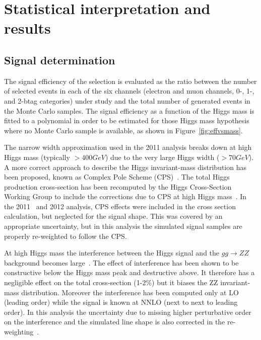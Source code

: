 

\chapter{Statistical interpretation and results}
\label{sec:results}

\section{Signal determination}
The signal efficiency of the selection is evaluated as the ratio between the number of selected events in each of the six channels (electron and muon channels, 0-, 1-, and 2-btag categories) under study and the total number of generated events in the Monte Carlo samples.  The signal efficiency as a function of the Higgs mass is fitted to a polynomial in order to be estimated for those Higgs mass hypothesis where no Monte Carlo sample is available, 
as shown in Figure~\ref{fig:effvsmass}.

The narrow width approximation used in the 2011 analysis breaks down at high Higgs mass (typically $>400 GeV$) due to the very large Higgs width ($>70 GeV$). 
A more correct approach to describe the Higgs invariant-mass distribution has been proposed, known as Complex Pole Scheme (CPS)~\cite{Goria:2011wa}.
The total Higgs production cross-section has been recomputed by the Higgs Cross-Section Working Group to include the corrections due to CPS at high Higgs mass~\cite{LHC-HCS}.  In the 2011~\cite{HIG-11-027} and 2012 analysis, CPS effects were included in the cross section calculation, but neglected for the signal shape.  This was covered by an appropriate uncertainty, but in this analysis the simulated signal samples are properly re-weighted to follow the CPS.

At high Higgs mass the interference between the Higgs signal and the $gg\rightarrow ZZ$ background becomes large~\cite{Passarino:2012ri}.  The effect of interference has been shown to be constructive below the Higgs mass peak and destructive above. It therefore has a negligible effect on the total cross-section (1-2\%) but it biases the ZZ invariant-mass distribution. Moreover the interference has been computed only at LO (leading order) while the signal is known at NNLO (next to next to leading order). In this analysis the uncertainty due to missing higher perturbative order on the interference and the simulated line shape is also corrected in the re-weighting~\cite{Passarino:2012ri}.

